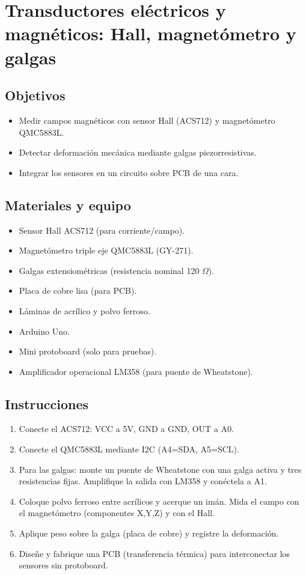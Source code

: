 \chapter{Transductores eléctricos y magnéticos: Hall, magnetómetro y galgas}

\section*{Objetivos}
\begin{itemize}
    \item Medir campos magnéticos con sensor Hall (ACS712) y magnetómetro QMC5883L.
    \item Detectar deformación mecánica mediante galgas piezorresistivas.
    \item Integrar los sensores en un circuito sobre PCB de una cara.
\end{itemize}

\section*{Materiales y equipo}
\begin{itemize}
    \item Sensor Hall ACS712 (para corriente/campo).
    \item Magnetómetro triple eje QMC5883L (GY-271).
    \item Galgas extensiométricas (resistencia nominal 120 $\Omega$).
    \item Placa de cobre lisa (para PCB).
    \item Láminas de acrílico y polvo ferroso.
    \item Arduino Uno.
    \item Mini protoboard (solo para pruebas).
    \item Amplificador operacional LM358 (para puente de Wheatstone).
\end{itemize}

\section*{Instrucciones}
\begin{enumerate}
    \item Conecte el ACS712: VCC a 5V, GND a GND, OUT a A0.
    \item Conecte el QMC5883L mediante I2C (A4=SDA, A5=SCL).
    \item Para las galgas: monte un puente de Wheatstone con una galga activa y tres resistencias fijas. Amplifique la salida con LM358 y conéctela a A1.
    \item Coloque polvo ferroso entre acrílicos y acerque un imán. Mida el campo con el magnetómetro (componentes X,Y,Z) y con el Hall.
    \item Aplique peso sobre la galga (placa de cobre) y registre la deformación.
    \item Diseñe y fabrique una PCB (transferencia térmica) para interconectar los sensores sin protoboard.
\end{enumerate}

